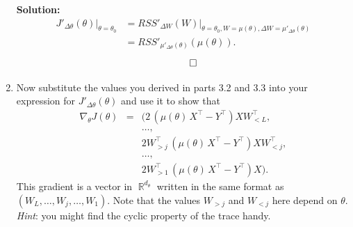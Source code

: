 \documentclass{article}
\DeclareMathOperator{\R}{\mathbb{R}}
\newenvironment{solution}{\color{blue} \smallskip \textbf{Solution:}}{}
\begin{document}
\begin{enumerate}
    \begin{solution}
        \begin{align*}
        J'_{\Delta \theta}(\theta)|_{\theta = \theta_0} &= RSS'_{\Delta W}(W)|_{\theta = \theta_0, W = \mu(\theta), \Delta W = \mu'_{\Delta \theta}(\theta)} \\
        &= RSS'_{\mu'_{\Delta \theta}(\theta)}(\mu(\theta)).
        \end{align*}
        \[ \qedhere \]
    \end{solution}

    \item
    Now substitute the values you derived in parts 3.2 and 3.3 into your expression for $J'_{\Delta \theta}(\theta)$ and use it to show that
    \begin{eqnarray*}
    \nabla_\theta J(\theta) & = & (2 \, (\mu(\theta)\, X^\top - Y^\top) X W_{<L}^\top, \\ 
                            &   & \ldots, \\
                            &   & 2 W_{>j}^\top \, (\mu(\theta)\, X^\top - Y^\top) X W_{<j}^\top, \\
                            &   & \ldots, \\
                            &   & 2 W_{>1}^\top \, (\mu(\theta)\, X^\top - Y^\top) X).
    \end{eqnarray*}
    This gradient is a vector in $\R^{d_\theta}$ written in the same format as $(W_L, \ldots, W_j, \ldots, W_1)$.
    Note that the values $W_{>j}$ and $W_{<j}$ here depend on $\theta$. \\
    {\em Hint}:  you might find the cyclic property of the trace handy.


\end{enumerate}
\end{document}
